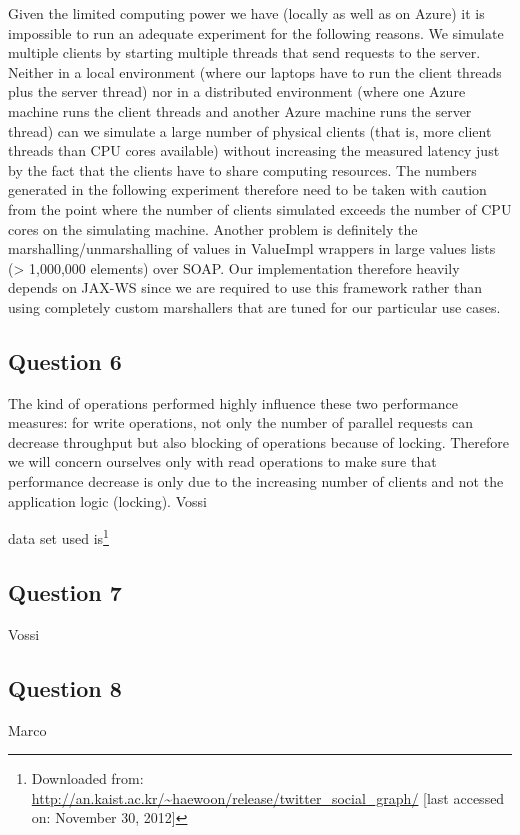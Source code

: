 \documentclass[12pt,a4paper]{article}
\begin{document}
  Given the limited computing power we have (locally as well as on Azure) it is impossible to run an adequate experiment for the following reasons. We simulate multiple clients by starting multiple threads that send requests to the server. Neither in a local environment (where our laptops have to run the client threads plus the server thread) nor in a distributed environment (where one Azure machine runs the client threads and another Azure machine runs the server thread) can we simulate a large number of physical clients (that is, more client threads than CPU cores available) without increasing the measured latency just by the fact that the clients have to share computing resources. The numbers generated in the following experiment therefore need to be taken with caution from the point where the number of clients simulated exceeds the number of CPU cores on the simulating machine. Another problem is definitely the marshalling/unmarshalling of values in ValueImpl wrappers in large values lists (> 1,000,000 elements) over SOAP. Our implementation therefore heavily depends on JAX-WS since we are required to use this framework rather than using completely custom marshallers that are tuned for our particular use cases.

\subsection*{Question 6}
\label{sec:pq6}
The kind of operations performed highly influence these two performance measures: for write operations, not only the number of parallel requests can decrease throughput but also blocking of operations because of locking. Therefore we will concern ourselves only with read operations to make sure that performance decrease is only due to the increasing number of clients and not the application logic (locking).
Vossi

data set used is\footnote{Downloaded from: \url{http://an.kaist.ac.kr/~haewoon/release/twitter_social_graph/} [last accessed on: November 30, 2012]}

\subsection*{Question 7}
\label{sec:pq7} 
Vossi

\subsection*{Question 8}
\label{sec:pq8}
Marco
\end{document}
